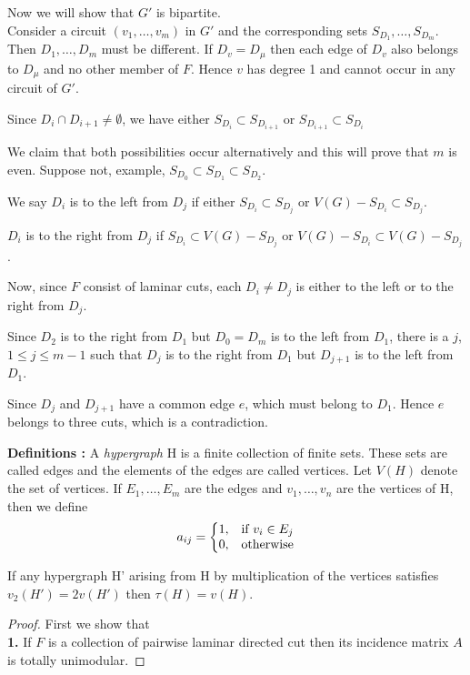 \documentclass[8pt]{beamer}
\begin{document}
\begin{frame}

Now we will show that $G'$ is bipartite. \\
Consider a circuit $(v_1,\dots,v_m)$ in $G'$ and the corresponding sets $S_{D_1},\dots,S_{D_m}$. Then $D_1,\dots,D_m$ must be different. If $D_v = D_\mu$ then each edge of $D_v$ also belongs to $D_\mu$ and no other member of $F$. Hence $v$ has degree 1 and cannot occur in any circuit of $G'$.

Since $D_i \cap D_{i+1} \ne \emptyset$, we have either $S_{D_i}\subset S_{D_{i+1}}$ or $S_{D_{i+1}}\subset S_{D_i}$

We claim that both possibilities occur alternatively and this will prove that $m$ is even. Suppose not, example, $S_{D_0} \subset S_{D_1}\subset S_{D_2}$. 

We say $D_i$ is to the left from $D_j$ if either $S_{D_i}\subset S_{D_j}$ or $V(G)-S_{D_i}\subset S_{D_j}$. 

$D_i$ is to the right from $D_j$ if $S_{D_i}\subset V(G)-S_{D_j}$ or $V(G)-S_{D_i}\subset V(G)-S_{D_j}$. 

Now, since $F$ consist of laminar cuts, each $D_i\ne D_j$ is either to the left or to the right from $D_j$.

Since $D_2$ is to the right from $D_1$ but $D_0 = D_m$ is to the left from $D_1$, there is a $j$, $1\le j\le m-1$ such that $D_j$ is to the right from $D_1$ but $D_{j+1}$ is to the left from $D_1$.  
    
Since $D_j$ and $D_{j+1}$ have a common edge $e$, which must belong to $D_1$. Hence $e$ belongs to three cuts, which is a contradiction. 

\eofproof
\end{frame}

\begin{frame}

\textbf{Definitions : }
A \textit{hypergraph} H is a finite collection of finite sets. These sets are called edges and the elements of the edges are called vertices. Let $V(H)$ denote the set of vertices. If $E_1,\dots,E_m$ are the edges and $v_1,\dots,v_n$ are the vertices of H, then we define 
$$
    a_{ij}=\left\{
    \begin{array}{@{}ll@{}}
    1, & \text{if}\ v_i \in E_j \\
    0, & \text{otherwise}
    \end{array}\right.
$$

\begin{hypergraph}[Hypergraph]
If any hypergraph H' arising from H by multiplication of the vertices satisfies $v_2(H') = 2v(H')$ then $\tau(H) = v(H)$. 
\end{hypergraph}

\begin{proof}
First we show that\\
\textbf{1.} If $F$ is a collection of pairwise laminar directed cut then its incidence matrix $A$ is totally unimodular. 

\end{proof}
\end{frame}
\end{document}
